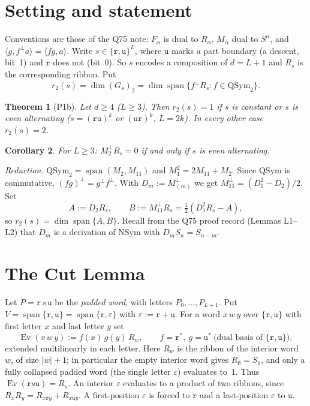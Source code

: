 \documentclass[11pt]{amsart}
\newcommand{\QSym}{\mathrm{QSym}}
\newcommand{\NSym}{\mathrm{NSym}}
\newcommand{\Ev}{\operatorname{Ev}}
\newcommand{\tr}{\mathtt{r}}
\newcommand{\tu}{\mathtt{u}}
\newcommand{\te}{\varepsilon}
\theoremstyle{plain}
\newtheorem{theorem}{Theorem}
\newtheorem{corollary}[theorem]{Corollary}
\theoremstyle{definition}
\begin{document}
\section{Setting and statement}
Conventions are those of the Q75 note: $F_\alpha$ is dual to $R_\alpha$, $M_\alpha$ dual to $S^\alpha$, and $\langle g,f^\perp a\rangle=\langle fg,a\rangle$. Write $s\in\{\tr,\tu\}^L$, where $\tu$ marks a part boundary (a descent, bit~1) and $\tr$ does not (bit~0). So $s$ encodes a composition of $d=L+1$ and $R_s$ is the corresponding ribbon. Put
\[
r_2(s)=\dim(G_s)_2=\dim\operatorname{span}\{f^\perp R_s: f\in\QSym_2\}.
\]

\begin{theorem}[P1b]\label{thm:main}
Let $d\ge4$ ($L\ge3$). Then $r_2(s)=1$ if $s$ is constant or $s$ is even alternating ($s=(\tr\tu)^k$ or $(\tu\tr)^k$, $L=2k$). In every other case $r_2(s)=2$.
\end{theorem}

\begin{corollary}\label{cor:m2}
For $L\ge3$: $M_2^\perp R_s=0$ if and only if $s$ is even alternating.
\end{corollary}

\noindent\emph{Reduction.} $\QSym_2=\operatorname{span}(M_2,M_{11})$ and $M_1^2=2M_{11}+M_2$. Since $\QSym$ is commutative, $(fg)^\perp=g^\perp f^\perp$. With $D_m:=M_{(m)}^\perp$ we get $M_{11}^\perp=(D_1^2-D_2)/2$. Set
\[
A:=D_2R_s,\qquad B:=M_{11}^\perp R_s=\tfrac12(D_1^2R_s-A),
\]
so $r_2(s)=\dim\operatorname{span}\{A,B\}$. Recall from the Q75 proof record (Lemmas L1--L2) that $D_m$ is a derivation of $\NSym$ with $D_mS_n=S_{n-m}$.

\section{The Cut Lemma}
Let $P=\tr\,s\,\tu$ be the \emph{padded word}, with letters $P_0,\dots,P_{L+1}$. Put $V=\operatorname{span}\{\tr,\tu\}=\operatorname{span}\{\tr,\te\}$ with $\te:=\tr+\tu$. For a word $x\,w\,y$ over $\{\tr,\tu\}$ with first letter $x$ and last letter $y$ set
\[
\Ev(x\,w\,y):=f(x)\,g(y)\,R_w,\qquad f=\tr^*,\ g=\tu^*\ \text{(dual basis of }\{\tr,\tu\}),
\]
extended multilinearly in each letter. Here $R_w$ is the ribbon of the interior word $w$, of size $|w|+1$; in particular the empty interior word gives $R_\emptyset=S_1$, and only a fully collapsed padded word (the single letter $\te$) evaluates to~$1$. Thus $\Ev(\tr s\tu)=R_s$. An interior $\te$ evaluates to a product of two ribbons, since $R_xR_y=R_{x\tr y}+R_{x\tu y}$. A first-position $\te$ is forced to $\tr$ and a last-position $\te$ to $\tu$.
\end{document}
